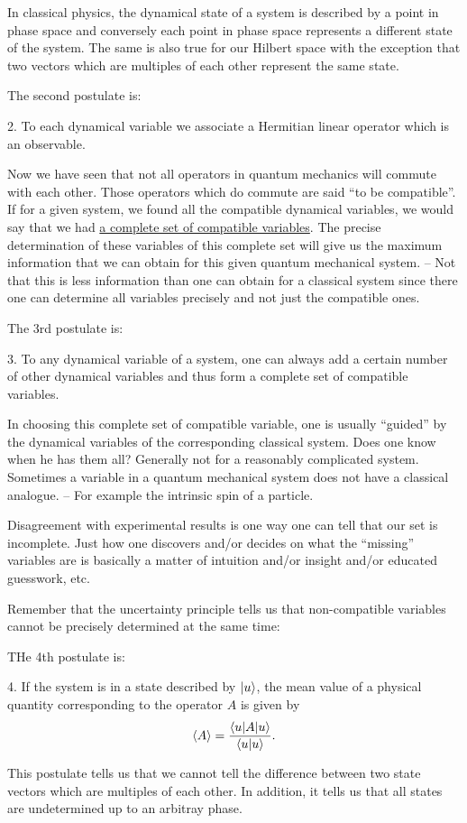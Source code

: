 In classical physics, the dynamical state of a system is described by a point in phase space and conversely each point in phase space represents a different state of the system. The same is also true for our Hilbert space with 
the exception that two vectors which are multiples of each other represent the same state. 

The second postulate is: 
\begin{postulate} 2. To each dynamical variable we associate a Hermitian linear operator which is an observable.
\end{postulate}
Now we have seen that not all operators in quantum mechanics will commute with each other. Those operators which do commute are said ``to be compatible''. If for a given system, we found all the compatible
dynamical variables, we would say that we had \underline{a complete set of compatible variables}. The precise determination of these variables of this complete set will give us the maximum information that we can obtain for 
this given quantum mechanical system. -- Not that this is less information than one can obtain for a classical system since there one can determine all variables precisely and not just the compatible ones. 

The 3rd postulate is: 
\begin{postulate}3. To any dynamical variable of a system, one can always add a certain number of other dynamical variables and thus form a complete set of compatible variables.
\end{postulate}
In choosing this complete set of compatible variable, one is usually ``guided'' by the dynamical variables of the corresponding classical system. Does one know when he has them all? Generally not for a reasonably complicated 
system. Sometimes a variable in a quantum mechanical system does not have a classical analogue. -- For example the intrinsic spin of a particle.

Disagreement with experimental results is one way one can tell that our set is incomplete. Just how one discovers and/or decides on  what the ``missing'' variables are is basically a matter of intuition and/or insight and/or
educated guesswork, etc. 

Remember that the uncertainty principle tells us that non-compatible variables cannot be precisely determined at the same time: 

THe 4th postulate is:
\begin{postulate}4. If the system is in a state described by $|u\rangle$, the mean value of a physical quantity corresponding to the operator $A$ is given by
$$\langle A\rangle = {\langle u| A| u \rangle\over \langle u|u\rangle }.$$
\end{postulate}
This postulate tells us that we cannot tell the difference between two state vectors which are multiples of each other. In addition, it tells us that all states are undetermined up to an arbitray phase. 

